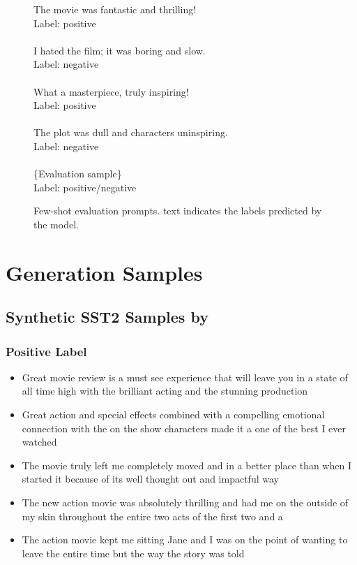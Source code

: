 \begin{figure}[ht]
\begin{tcolorbox}
The movie was fantastic and thrilling! \\
Label: positive \\ \\
I hated the film; it was boring and slow. \\
Label: negative \\ \\
What a masterpiece, truly inspiring! \\
Label: positive \\ \\ 
The plot was dull and characters uninspiring. \\
Label: negative \\ \\ 
\{Evaluation sample\} \\
Label: {\blue positive/negative}
\end{tcolorbox}
\vspace{-2mm}
\caption{Few-shot evaluation prompts. {\blue text} indicates the labels predicted by the model.} \label{fig:few_shot_evaluation_prompt}
\end{figure}


\section{Generation Samples}
\subsection{Synthetic SST2 Samples by \alg}
\subsubsection{Positive Label}
\begin{itemize}
    \item Great movie review is a must see experience that will leave you in a state of all time high with the brilliant acting and the stunning production 
    \item Great action and special effects combined with a compelling emotional connection with the on the show characters made it a one of the best I ever watched 
    \item  The movie truly left me completely moved and in a better place than when I started it because of its well thought out and impactful way  
    \item The new action movie was absolutely thrilling and had me on the outside of my skin throughout the entire two acts of the first two and a 
    \item The action movie kept me sitting Jane and I was on the point of wanting to leave the entire time but the way the story was told  
\end{itemize}

